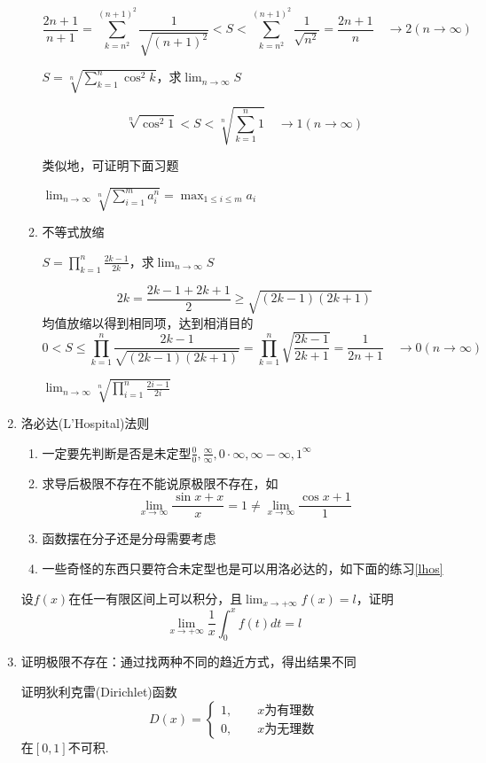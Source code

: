\begin{enumerate}
\begin{enumerate}
\begin{example}
		\end{example}
		\begin{analysis}\[\frac{2n+1}{n+1}=\sum _{k=n^2}^{(n+1)^2}\frac{1}{\sqrt{(n+1)^2}}<S<\sum _{k=n^2}^{(n+1)^2}\frac{1}{\sqrt{n^2}}=\frac{2n+1}{n}\quad\to 2(n\to\infty)\]
		\end{analysis}
		\begin{example}
		\label{jb2}
		$\displaystyle S=\sqrt[n]{\sum_{k=1}^{n}\cos^2 k}$，求$\displaystyle\lim_{n\to\infty}S$
		\end{example}
		\begin{analysis}
		\[\sqrt[n]{\cos^2 1}<S<\sqrt[n]{\sum_{k=1}^{n}1}\quad\to 1(n\to\infty)\]
		\end{analysis}
		类似地，可证明下面习题
		\begin{exercise}
		$\displaystyle \lim_{n\to\infty}\sqrt[n]{\sum_{i=1}^{m}a_i^n}=\max_{1\leq i\leq m}a_i$
		\end{exercise}
		\item 不等式放缩
		\begin{example}
		$\displaystyle S=\prod_{k=1}^{n}\frac{2k-1}{2k}$，求$\displaystyle\lim_{n\to\infty}S$
		\end{example}
		\begin{analysis}
		\[2k=\frac{2k-1+2k+1}{2}\ge\sqrt{(2k-1)(2k+1)}\]
		均值放缩以得到相同项，达到相消目的
		\[0<S\leq\prod_{k=1}^{n}\frac{2k-1}{\sqrt{(2k-1)(2k+1)}}=\prod_{k=1}^{n}\sqrt{\frac{2k-1}{2k+1}}=\frac{1}{2n+1}\quad\to 0(n\to\infty)\]
		\end{analysis}
		\begin{exercise}
		$\displaystyle\lim_{n\to\infty}\sqrt[n]{\prod_{i=1}^{n}\frac{2i-1}{2i}}$
		\end{exercise}
	\end{enumerate}
	\item 洛必达(L'Hospital)法则
	\begin{enumerate}
		\item 一定要先判断是否是未定型$\displaystyle\frac{0}{0},\frac{\infty}{\infty},0\cdot\infty,\infty-\infty,1^\infty$
		\item 求导后极限不存在不能说原极限不存在，如
		\[\lim_{x\to\infty}\frac{\sin x+x}{x}=1\ne\lim_{x\to\infty}\frac{\cos x+1}{1}\]
		\item 函数摆在分子还是分母需要考虑
		\item 一些奇怪的东西只要符合未定型也是可以用洛必达的，如下面的练习\ref{lhos}
	\end{enumerate}
	\begin{exercise}
	\label{lhos}
	设$f(x)$在任一有限区间上可以积分，且$\displaystyle\lim_{x\to+\infty}f(x)=l$，证明
	\[\lim_{x\to+\infty}\frac{1}{x}\int_0^xf(t)dt=l\]
	\end{exercise}
	\item 证明极限不存在：通过找两种不同的趋近方式，得出结果不同
	\begin{exercise}
	证明狄利克雷(Dirichlet)函数
	\[D(x)=\begin{cases}
	1,\qquad x\mbox{为有理数}\\
	0,\qquad x\mbox{为无理数}\end{cases}\]
	在$[0,1]$不可积.
	\end{exercise}
\end{enumerate}
